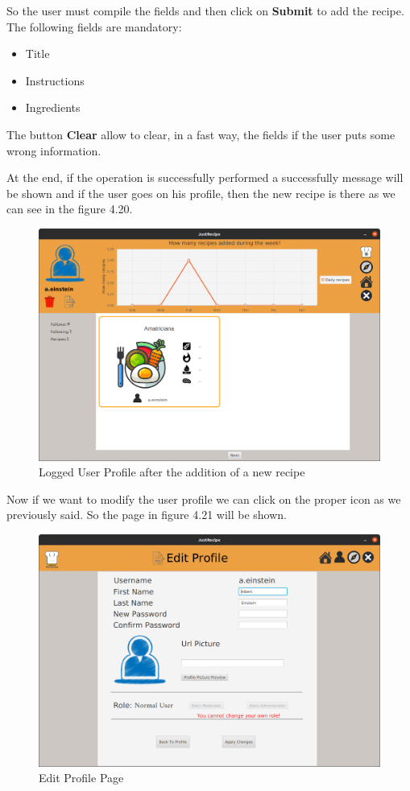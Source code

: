 \documentclass[a4paper]{report}
\begin{document}
\noindent So the user must compile the fields and then click on \textbf{Submit} to add the recipe. The following fields are mandatory:
\begin{itemize}
	\item Title
	\item Instructions
	\item Ingredients
\end{itemize}

\noindent The button \textbf{Clear} allow to clear, in a fast way, the fields if the user puts some wrong information.

\noindent At the end, if the operation is successfully performed a successfully message will be shown and if the user goes on his profile, then the new recipe is there as we can see in the figure 4.20.

\begin{figure}[htpb]
	\centering
	\includegraphics[scale=0.25]{img/user_manual/afteraddrecipe.png}
	\caption{Logged User Profile after the addition of a new recipe}
\end{figure}

\noindent Now if we want to modify the user profile we can click on the proper icon as we previously said. So the page in figure 4.21 will be shown.

\begin{figure}[htpb]
	\centering
	\includegraphics[scale=0.25]{img/user_manual/editprofile.png}
	\caption{Edit Profile Page}
\end{figure}
\end{document}
